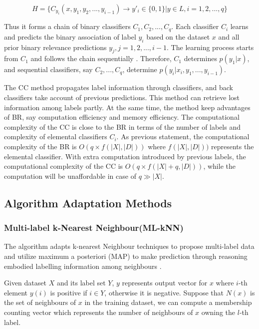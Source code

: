 \begin{equation}\label{eq:ClassifierChains}
H = \{C_{y_{i}}(x, y_{1},y_{2},...,y_{i-1}) \to y'_{i} \in \{0,1\}| y \in L, i = 1,2,...,q\}
\end{equation}

Thus it forms a chain of binary classifiers $C_{1},C_{2},...,C_{q}$. Each classifier $C_{i}$ learns and predicts the binary association of label $y_{i}$ based on the dataset $x$ and all prior binary relevance predictions $y_{j}, j = 1,2,...,i-1$. The learning process starts from $C_{1}$ and follows the chain sequentially . Therefore, $C_{1}$ determines $p(y_{1}|x)$, and sequential classifiers, say $C_{2},...,C_{q}$, determine $p(y_{i}|x_{i},y_{1},...,y_{i-1})$.

The CC method propagates label information through classifiers, and back classifiers take account of previous predictions. This method can retrieve lost information among labels partly. At the same time, the method keep advantages of BR, say computation efficiency and memory efficiency. The computational complexity of the CC is close to the BR in terms of the number of labels and complexity of elemental classifiers $C_{i}$. As previous statement, the computational complexity of the BR is $O(q \times f(|X|,|D|))$ where $f(|X|,|D|))$ represents the elemental classifier. With extra computation introduced by previous labels, the computational complexity of the CC is $O(q \times f(|X|+q,|D|))$, while the computation will be unaffordable in case of $q \gg |X|$.

\subsection{Algorithm Adaptation Methods}

\subsubsection{Multi-label k-Nearest Neighbour(ML-kNN)}

The algorithm adapts k-nearest Neighbour techniques to propose multi-label data and utilize maximum a posteriori (MAP) to make prediction through reasoning embodied labelling information among neighbours \citep{zhang2007ml}.

Given dataset $X$ and its label set $Y$, $y$ represents output vector for $x$ where $i$-th element $y(i)$ is positive if $i \in Y$, otherwise it is negative. Suppose that $N(x)$ is the set of neighbours of $x$ in the training dataset, we can compute a membership counting vector which represents the number of neighbours of $x$ owning the $l$-th label.

